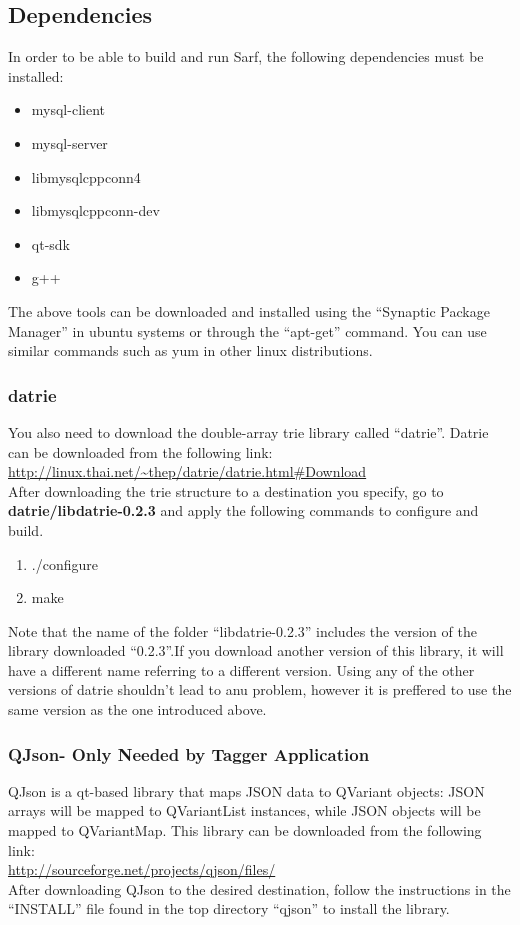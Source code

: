 \documentclass{article}
\begin{document}
\subsection{Dependencies}
\label{subsec:dependencies}
In order to be able to build and run Sarf, the following dependencies must be installed:
\begin{itemize}
\item mysql-client
\item mysql-server
\item libmysqlcppconn4
\item libmysqlcppconn-dev
\item qt-sdk
\item g++
\end{itemize}
The above tools can be downloaded and installed using the ``Synaptic Package Manager'' in ubuntu systems or through the ``apt-get'' command. You can use similar commands such as yum in other linux distributions.
\subsubsection{datrie}
You also need to download the double-array trie library called ``datrie''. Datrie can be downloaded from the following link:\\
\url{http://linux.thai.net/~thep/datrie/datrie.html#Download }\\
After downloading the trie structure to a destination you specify, go to {\bf datrie/libdatrie-0.2.3} and apply the following commands to configure and build.
\begin{enumerate}
\item ./configure
\item make
\end{enumerate}
Note that the name of the folder ``libdatrie-0.2.3'' includes the version of the library downloaded ``0.2.3''.If you download another version of this library, it will have a different name referring to a different version. Using any of the other versions of datrie shouldn't lead to anu problem, however it is preffered to use the same version as the one introduced above.

\subsubsection{QJson- Only Needed by Tagger Application}
QJson is a qt-based library that maps JSON data to QVariant objects: JSON arrays will be mapped to QVariantList instances, while JSON objects will be mapped to QVariantMap. This library can be downloaded from the following link:\\
\url{http://sourceforge.net/projects/qjson/files/}\\
After downloading QJson to the desired destination, follow the instructions in the ``INSTALL'' file found in the top directory ``qjson'' to install the library.
\end{document}
